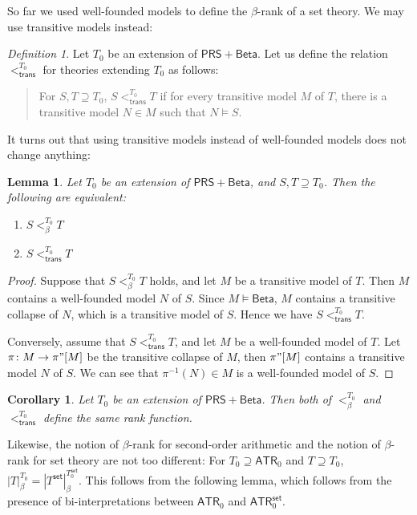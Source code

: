 \documentclass{amsart}
\newtheorem{lemma}[theorem]{Lemma}
\newtheorem{corollary}[corollary]{Corollary}
\theoremstyle{remark}
\newtheorem{definition}[definition]{Definition}
\newcommand{\PRS}{\mathsf{PRS}}
\newcommand{\Beta}{\mathsf{Beta}}
\newcommand{\ATR}{\mathsf{ATR}}
\newcommand{\set}{\mathsf{set}}
\newcommand{\trans}{\mathsf{trans}}
\begin{document}
So far we used well-founded models to define the $\beta$-rank of a set theory. We may use transitive models instead:
\begin{definition}
    Let $T_0$ be an extension of $\PRS+\Beta$. Let us define the relation $<^{T_0}_\trans$ for theories extending $T_0$ as follows:
    \begin{quote}
        For $S,T\supseteq T_0$, $S<^{T_0}_\trans T$ if for every transitive model $M$ of $T$, there is a transitive model $N\in M$ such that $N\vDash S$.
    \end{quote}
\end{definition}

It turns out that using transitive models instead of well-founded models does not change anything:
\begin{lemma} \label{Lemma: Beta rank and transitive rank}
    Let $T_0$ be an extension of $\PRS+\Beta$, and $S,T\supseteq T_0$. Then the following are equivalent:
    \begin{enumerate}
        \item $S<^{T_0}_\beta T$
        \item $S<^{T_0}_\trans T$
    \end{enumerate}
\end{lemma}
\begin{proof}
    Suppose that $S<^{T_0}_\beta T$ holds, and let $M$ be a transitive model of $T$. Then $M$ contains a well-founded model $N$ of $S$. Since $M\vDash\Beta$, $M$ contains a transitive collapse of $N$, which is a transitive model of $S$. Hence we have $S<^{T_0}_\trans T$.

    Conversely, assume that $S<^{T_0}_\trans T$, and let $M$ be a well-founded model of $T$. Let $\pi\colon M\to \pi"[M]$ be the transitive collapse of $M$, then $\pi"[M]$ contains a transitive model $N$ of $S$. We can see that $\pi^{-1}(N)\in M$ is a well-founded model of $S$.
\end{proof}

\begin{corollary}
    Let $T_0$ be an extension of $\PRS+\Beta$. Then both of $<^{T_0}_\beta$ and $<^{T_0}_\trans$ define the same rank function.
\end{corollary}


Likewise, the notion of $\beta$-rank for second-order arithmetic and the notion of $\beta$-rank for set theory are not too different: For $T_0\supseteq \ATR_0$ and $T\supseteq T_0$, $|T|_{\beta}^{T_0} = |T^\set|_{\beta}^{T_0^\set}$. This follows from the following lemma, which follows from the presence of bi-interpretations between $\ATR_0$ and $\ATR_0^\set$.
\end{document}
